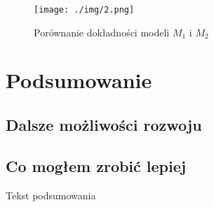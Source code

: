 \documentclass{report}
\begin{document}
    \begin{figure}[h]
        \centering
        \texttt{[image: ./img/2.png]}
        \caption{Porównanie dokładności modeli $M_1$ i $M_2$}
    \end{figure}

    \chapter{Podsumowanie}\label{ch:podsumowanie}

    \section{Dalsze możliwości rozwoju}\label{sec:dalszeMozliwosciRozwoju}

    \section{Co mogłem zrobić lepiej}\label{sec:coMoglemZrobicLepiej}

    Tekst podsumowania

    
    

    \listoffigures
    \listoftables
\end{document}
